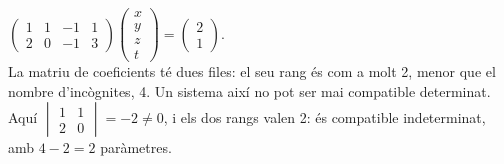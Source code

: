 \begin{apartats}
\begin{nomesllarg}
\begin{solucio}
$\begin{pmatrix}1&1&-1&1\\2&0&-1&3\end{pmatrix}\begin{pmatrix}x\\y\\z\\t\end{pmatrix}=\begin{pmatrix}2\\1\end{pmatrix}$.\\
La matriu de coeficients té dues files: el seu rang és com a molt 2, menor que el nombre d'incògnites,
4. Un sistema així no pot ser mai compatible determinat. Aquí $\begin{vmatrix}1&1\\2&0\end{vmatrix}=-2\ne0$,
i els dos rangs valen 2: és compatible indeterminat, amb $4-2=2$ paràmetres.
\end{solucio}
\end{nomesllarg}

\end{apartats}

